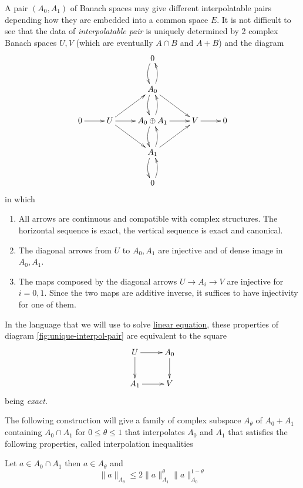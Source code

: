 \begin{remark}
\label{rem:interp-pair}
A pair \((A_0, A_1)\) of Banach spaces may give different interpolatable pairs depending
how they are embedded into a common space \(E\). It is not difficult to see that the data of \emph{interpolatable pair} is
uniquely determined by 2 complex Banach spaces \(U,V\) (which are eventually \(A\cap B\) and \(A+B\)) and the diagram
\begin{equation}
\label{fig:unique-interpol-pair}
\xymatrix{
 &  & 0 \ar@/_/@{->}[d] &  &  \\
 &  & A_0 \ar@{->}[rd] \ar@/_/@{->}[d] \ar@/_/@{->}[u] &  &  \\
0 \ar@{->}[r] & U \ar@{->}[r] \ar@{->}[ru] \ar@{->}[rd] & A_0\oplus A_1 \ar@{->}[r] \ar@/_/@{->}[d] \ar@/_/@{->}[u] & V \ar@{->}[r] & 0 \\
 &  & A_1 \ar@{->}[ru] \ar@/_/@{->}[d] \ar@/_/@{->}[u] &  &  \\
 &  & 0 \ar@/_/@{->}[u] &  & 
}
\end{equation}
in which 
\begin{enumerate}
\item All arrows are continuous and compatible with complex structures. The horizontal sequence
is exact, the vertical sequence is exact and canonical.
\item The diagonal arrows from \(U\) to \(A_0, A_1\) are injective and of dense image in
\(A_0, A_1\).
\item The maps composed by the diagonal arrows \(U \to A_i \to V\) are injective for \(i=0,1\). Since the two maps are additive inverse, it suffices to have injectivity for
one of them.
\end{enumerate}

In the language that we will use to solve \href{./elliptic-parabolic.org}{linear equation}, these properties of diagram
\eqref{fig:unique-interpol-pair} are equivalent to the square
\[
 \xymatrix{
U \ar@{->}[r] \ar@{->}[d] & A_0 \ar@{->}[d] \\
A_1 \ar@{->}[r] & V
}
\]
being \emph{exact}.
\end{remark}

The following construction will give a family of complex subspace \(A_\theta\) of \(A_0+A_1\) containing \(A_0\cap A_1\) for \(0\leq \theta\leq 1\) that interpolates \(A_0\) and \(A_1\) that satisfies the following properties, called interpolation
inequalities

\begin{theorem}
\label{thm:interp-ineq-ele}
Let \(a\in A_0\cap A_1\) then \(a\in A_\theta\) and
\[
 \|a\|_{A_\theta}\leq 2 \|a\|_{A_1}^\theta \|a\|_{A_0}^{1-\theta}
\]
\end{theorem}


